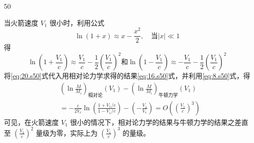 \begin{solution}{50}
\begin{subsolution}
当火箭速度 $V_{1}$ 很小时，利用公式
\begin{equation}
\ln(1+x) \approx x - \frac{x^{2}}{2}, \quad \text{当} |x| \ll 1
\label{eq:19.s50}
\end{equation}
得
\begin{equation}
\ln\left(1 + \frac{V_{1}}{c}\right) \approx \frac{V_{1}}{c} - \frac{1}{2}\left(\frac{V_{1}}{c}\right)^{2} \text{和} \ln\left(1 - \frac{V_{1}}{c}\right) \approx -\frac{V_{1}}{c} - \frac{1}{2}\left(\frac{V_{1}}{c}\right)^{2}
\label{eq:20.s50}
\end{equation}
将\eqref{eq:20.s50}式代入用相对论力学求得的结果\eqref{eq:16.s50}式，并利用\eqref{eq:8.s50}式，得
\begin{equation}
\begin{array}{rl}
&\left(\ln \frac{M}{M_{i}}\right)_{\text{相对论}}(V_{1}) - \left(\ln \frac{M}{M_{i}}\right)_{\text{牛顿力学}}(V_{1}) \\
&= -\frac{c}{2V_{e}} \ln \left(\frac{1 + V_{1}/c}{1 - V_{1}/c}\right) - \left(-\frac{V_{1}}{V_{e}}\right) = O\left(\left(\frac{V_{1}}{c}\right)^{3}\right)
\end{array}
\label{eq:21.s50}
\end{equation}
可见，在火箭速度 $V_{1}$ 很小的情况下，相对论力学的结果与牛顿力学的结果之差直至 $\left(\frac{V_{1}}{c}\right)^{2}$ 量级为零，实际上为 $\left(\frac{V_{1}}{c}\right)^{3}$ 的量级。
\end{subsolution}
\end{solution}